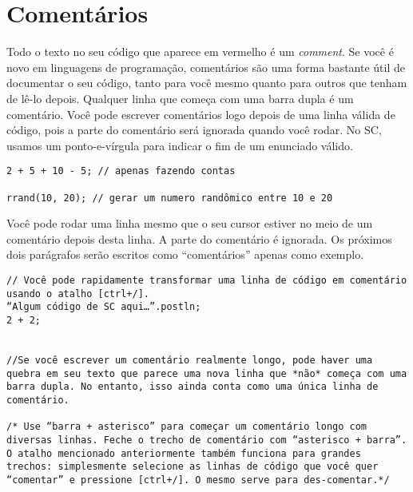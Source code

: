 \section{Comentários}

Todo o texto no seu código que aparece em vermelho é um \emph{comment}. Se você é novo em linguagens de programação, comentários são uma forma bastante útil de documentar o seu código, tanto para você mesmo quanto para outros que tenham de lê-lo depois. Qualquer linha que começa com uma barra dupla é um comentário. Você pode escrever comentários logo depois de uma linha válida de código, pois a parte do comentário será ignorada quando você rodar. No SC, usamos um ponto-e-vírgula para indicar o fim de um enunciado válido.

\begin{lstlisting}[style=SuperCollider-IDE, basicstyle=\scttfamily\footnotesize]
2 + 5 + 10 - 5; // apenas fazendo contas

rrand(10, 20); // gerar um numero randômico entre 10 e 20
\end{lstlisting}

Você pode rodar uma linha mesmo que o seu cursor estiver no meio de um comentário depois desta linha. A parte do comentário é ignorada. Os próximos dois parágrafos serão escritos como “comentários” apenas como exemplo.


 
\begin{lstlisting}[style=SuperCollider-IDE, basicstyle=\scttfamily\footnotesize]
// Você pode rapidamente transformar uma linha de código em comentário usando o atalho [ctrl+/].
“Algum código de SC aqui…”.postln;
2 + 2;


//Se você escrever um comentário realmente longo, pode haver uma quebra em seu texto que parece uma nova linha que *não* começa com uma barra dupla. No entanto, isso ainda conta como uma única linha de comentário.

/* Use “barra + asterisco” para começar um comentário longo com diversas linhas. Feche o trecho de comentário com “asterisco + barra”. O atalho mencionado anteriormente também funciona para grandes trechos: simplesmente selecione as linhas de código que você quer “comentar” e pressione [ctrl+/]. O mesmo serve para des-comentar.*/
\end{lstlisting}
